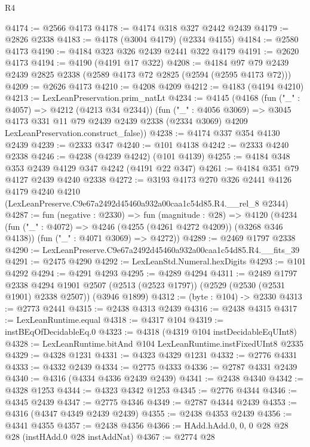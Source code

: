 \begin{lexlean}{R4}
\begin{coremodule}
@4174 := @2566 @4173
@4178 := @4174 @318 @327 @2442 @2439
@4179 := @2826 @2338
@4183 := @4178 (@3004 @4179) (@2334 @4155)
@4184 := @2580 @4173
@4190 := @4184 @323 @326 @2439 @2441 @322 @4179
@4191 := @2620 @4173
@4194 := @4190 (@4191 @17 @322)
@4208 := @4184 @97 @79 @2439 @2439 @2825 @2338 (@2589 @4173 @72 @2825 (@2594 (@2595 @4173 @72)))
@4209 := @2626 @4173
@4210 := @4208 @4209
@4212 := @4183 (@4194 @4210)
@4213 := LexLeanPreservation.prim_natLt
@4234 := @4145
    (@4168
      (fun ("_" : @4057) => @4212 (@4213 @34 @2344))
      (fun ("_" : @4056 @3069) =>
      @3045
        @4173
        @331
        @11
        @79
        @2439
        @2439
        @2338
        (@2334 @3069)
        @4209
        LexLeanPreservation.construct_false))
@4238 := @4174 @337 @354 @4130 @2439
@4239 := @2333 @347
@4240 := @101 @4138
@4242 := @2333 @4240 @2338
@4246 := @4238 (@4239 @4242) (@101 @4139)
@4255 := @4184 @348 @353 @2439 @4129 @347 @4242 (@4191 @22 @347)
@4261 := @4184 @351 @79 @4127 @2439 @4240 @2338
@4272 := @3193
    @4173
    @270
    @326
    @2441
    @4126
    @4179
    @4240
    @4210
    (LexLeanPreserve.C9e67a2492d45460a932a00caa1c54d85.R4.__rel_8 @2344)
@4287 := fun (negative : @2330) =>
  fun (magnitude : @28) =>
  @4120
    (@4234
      (fun ("_" : @4072) => @4246 (@4255 (@4261 @4272 @4209)) (@3268 @346 @4138))
      (fun ("_" : @4071 @3069) => @4272))
@4289 := @2469 @1797 @2338
@4290 := LexLeanPreserve.C9e67a2492d45460a932a00caa1c54d85.R4.__fits_39
@4291 := @2475 @4290
@4292 := LexLeanStd.Numeral.hexDigits
@4293 := @101 @4292
@4294 := @4291 @4293
@4295 := @4289 @4294
@4311 := @2489
    @1797
    @2338
    @4294
    @1901
    @2507
    (@2513 (@2523 @1797))
    (@2529 (@2530 (@2531 @1901) @2338 @2507))
    (@3946 @1899)
@4312 := (byte : @104) -> @2330
@4313 := @2773 @2441
@4315 := @2438 @4313 @2439
@4316 := @2438 @4315
@4317 := LexLeanRuntime.equal
@4318 := @4317 @104
@4319 := instBEqOfDecidableEq.{0}
@4323 := @4318 (@4319 @104 instDecidableEqUInt8)
@4328 := LexLeanRuntime.bitAnd @104 LexLeanRuntime.instFixedUInt8 @2335
@4329 := @4328 @1231
@4331 := @4323 @4329 @1231
@4332 := @2776 @4331
@4333 := @4332 @2439
@4334 := @2775 @4333
@4336 := @2787 @4331 @2439
@4340 := @4316 (@4334 @4336 @2439 @2439)
@4341 := @2438 @4340
@4342 := @4328 @1253
@4344 := @4323 @4342 @1253
@4345 := @2776 @4344
@4346 := @4345 @2439
@4347 := @2775 @4346
@4349 := @2787 @4344 @2439
@4353 := @4316 (@4347 @4349 @2439 @2439)
@4355 := @2438 @4353 @2439
@4356 := @4341 @4355
@4357 := @2438 @4356
@4366 := HAdd.hAdd.{0, 0, 0} @28 @28 @28 (instHAdd.{0} @28 instAddNat)
@4367 := @2774 @28

\end{coremodule}
\end{lexlean}
